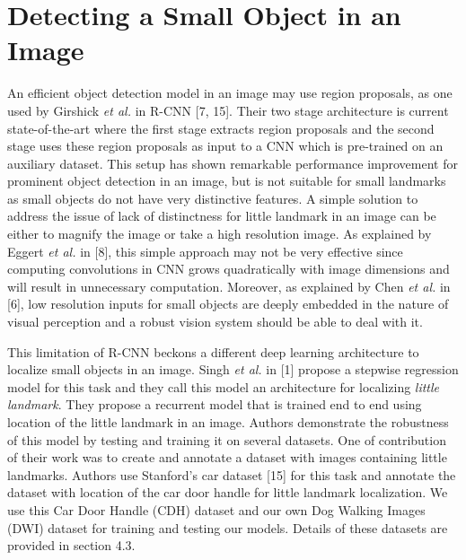 \documentclass [11pt,letterpaper ,twoside ,openany ]{report}
\begin{document}
    \chapter{Detecting a Small Object in an Image}
    \doublespacing
    An efficient object detection model in an image may use region proposals, as  one used by Girshick \textit {et al.} in R-CNN [7, 15]. Their two stage architecture is current state-of-the-art where the first stage extracts region proposals and the second stage uses these region proposals as input to a CNN which is pre-trained on an auxiliary dataset. This setup has shown remarkable performance improvement for prominent object detection in an image, but is not suitable for small landmarks as small objects do not have very distinctive features. A simple solution to address the issue of lack of distinctness for little landmark in an image can be either to magnify the image or take a high resolution image. As explained by Eggert \textit {et al.} in [8], this simple approach may not be very effective since computing convolutions in CNN grows quadratically with image dimensions and will result in unnecessary computation. Moreover, as explained by Chen \textit {et al.} in [6], low resolution inputs for small objects are deeply embedded  in the nature of visual perception and a robust vision system should be able to deal with it.
        
    This limitation of R-CNN beckons a different deep learning architecture to localize small objects in an image. Singh \textit {et al.} in [1] propose a stepwise regression model for this task and they call this model an architecture for localizing \textit {little landmark}. They propose a recurrent model that is trained end to end using location of the little landmark in an image. Authors demonstrate the robustness of this model by testing and training it on several datasets. One of contribution of their work was to create and annotate a dataset with images containing little landmarks. Authors use Stanford's car dataset [15] for this task and annotate the dataset with location of the car door handle for little landmark localization. We use this Car Door Handle (CDH) dataset and our own Dog Walking Images (DWI) dataset for training and testing our models. Details of these datasets are provided in section 4.3.
\end{document}
